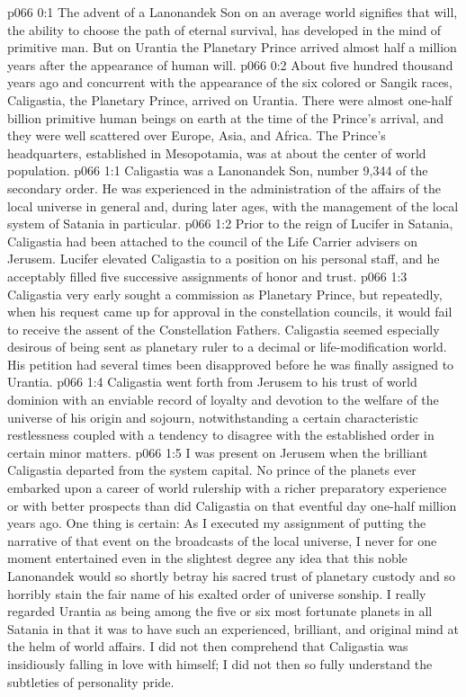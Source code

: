 \author{Melchizedek}
\vs p066 0:1 The advent of a Lanonandek Son on an average world signifies that will, the ability to choose the path of eternal survival, has developed in the mind of primitive man. But on Urantia the Planetary Prince arrived almost half a million years after the appearance of human will.
\vs p066 0:2 About five hundred thousand years ago and concurrent with the appearance of the six colored or Sangik races, Caligastia, the Planetary Prince, arrived on Urantia. There were almost one\hyp{}half billion primitive human beings on earth at the time of the Prince’s arrival, and they were well scattered over Europe, Asia, and Africa. The Prince’s headquarters, established in Mesopotamia, was at about the center of world population.\plusone
{}
\vs p066 1:1 Caligastia was a Lanonandek Son, number 9,344 of the secondary order. He was experienced in the administration of the affairs of the local universe in general and, during later ages, with the management of the local system of Satania in particular.
\vs p066 1:2 Prior to the reign of Lucifer in Satania, Caligastia had been attached to the council of the Life Carrier advisers on Jerusem. Lucifer elevated Caligastia to a position on his personal staff, and he acceptably filled five successive assignments of honor and trust.
\pc \vs p066 1:3 Caligastia very early sought a commission as Planetary Prince, but repeatedly, when his request came up for approval in the constellation councils, it would fail to receive the assent of the Constellation Fathers. Caligastia seemed especially desirous of being sent as planetary ruler to a decimal or life\hyp{}modification world. His petition had several times been disapproved before he was finally assigned to Urantia.
\vs p066 1:4 Caligastia went forth from Jerusem to his trust of world dominion with an enviable record of loyalty and devotion to the welfare of the universe of his origin and sojourn, notwithstanding a certain characteristic restlessness coupled with a tendency to disagree with the established order in certain minor matters.
\vs p066 1:5 I was present on Jerusem when the brilliant Caligastia departed from the system capital. No prince of the planets ever embarked upon a career of world rulership with a richer preparatory experience or with better prospects than did Caligastia on that eventful day one\hyp{}half million years ago. One thing is certain: As I executed my assignment of putting the narrative of that event on the broadcasts of the local universe, I never for one moment entertained even in the slightest degree any idea that this noble Lanonandek would so shortly betray his sacred trust of planetary custody and so horribly stain the fair name of his exalted order of universe sonship. I really regarded Urantia as being among the five or six most fortunate planets in all Satania in that it was to have such an experienced, brilliant, and original mind at the helm of world affairs. I did not then comprehend that Caligastia was insidiously falling in love with himself; I did not then so fully understand the subtleties of personality pride.\plusone
